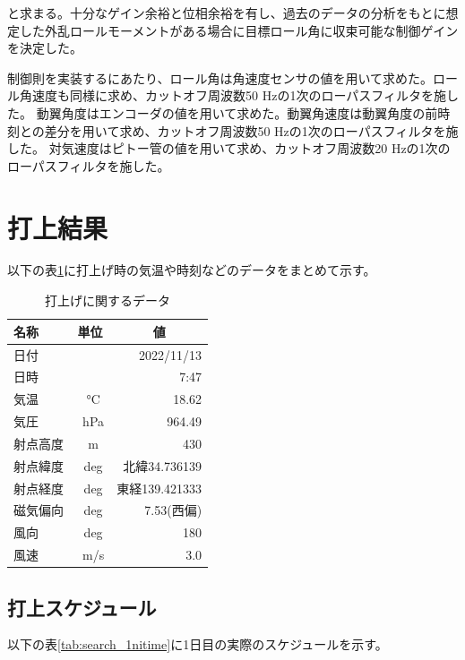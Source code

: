 \documentclass[a4paper,11pt,uplatex]{jsarticle}
\begin{document}
と求まる。十分なゲイン余裕と位相余裕を有し、過去のデータの分析をもとに想定した外乱ロールモーメントがある場合に目標ロール角に収束可能な制御ゲインを決定した。\par
制御則を実装するにあたり、ロール角は角速度センサの値を用いて求めた。ロール角速度も同様に求め、カットオフ周波数50 Hzの1次のローパスフィルタを施した。
動翼角度はエンコーダの値を用いて求めた。動翼角速度は動翼角度の前時刻との差分を用いて求め、カットオフ周波数50 Hzの1次のローパスフィルタを施した。
対気速度はピトー管の値を用いて求め、カットオフ周波数20 Hzの1次のローパスフィルタを施した。

\newpage
\section{打上結果}
以下の表\ref{tab:utiage_shogen}に打上げ時の気温や時刻などのデータをまとめて示す。
\begin{table}[H]
	\centering
	\caption{打上げに関するデータ}
	\label{tab:utiage_shogen}
	\begin{tabular}{lcr}
		\toprule
		名称   & 単位                    & \multicolumn{1}{c}{値} \\
		\midrule
		日付   &                       & 2022/11/13            \\
		日時   &                       & 7:47                  \\
		気温   & \SI{}{\degreeCelsius} & 18.62                 \\
		気圧   & \SI{}{hPa}            & 964.49                \\
		射点高度 & \SI{}{m}              & 430                   \\
		射点緯度 & \SI{}{deg}            & 北緯34.736139           \\
		射点経度 & \SI{}{deg}            & 東経139.421333          \\
		磁気偏向 & \SI{}{deg}            & 7.53(西偏)              \\
		風向   & \SI{}{deg}            & 180                   \\
		風速   & \SI{}{m/s}            & 3.0                   \\
		\bottomrule
	\end{tabular}
\end{table}

\subsection{打上スケジュール}
以下の表\ref{tab:search_1nitime}に1日目の実際のスケジュールを示す。
\end{document}
